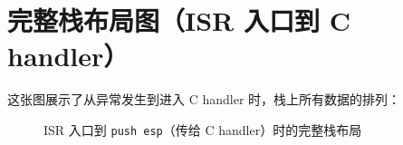 \section{完整栈布局图（ISR 入口到 C handler）}

这张图展示了从异常发生到进入 C handler 时，栈上所有数据的排列：

\begin{figure}[H]
  \centering
  
  \caption{ISR 入口到 \texttt{push esp}（传给 C handler）时的完整栈布局}
  \label{fig:isr-stack}
\end{figure}


